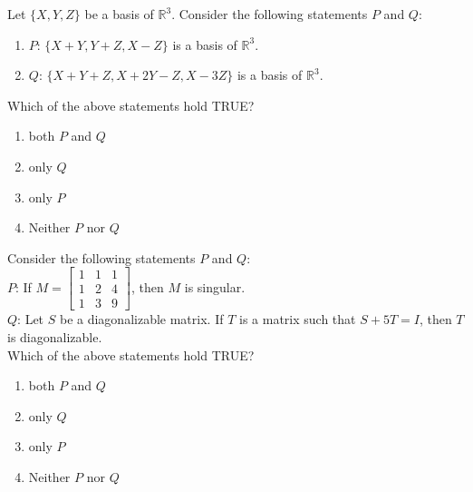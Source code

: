 \iffalse
                       
                        
                        
                        
                    
                        \author{AI24BTECH11006 - Bugada Roopansha}
                        \section{MA}
                        \chapter{2016}
                        \fi
 
    \item Let $\{X, Y, Z\}$ be a basis of $\mathbb{R}^3$. Consider the following statements $P$ and $Q$: 
    \begin{enumerate}
        \item $P$: $\{X+Y, Y+Z, X-Z\}$ is a basis of $\mathbb{R}^3$.
        \item $Q$: $\{X + Y + Z, X+2Y - Z, X-3Z\}$ is a basis of $\mathbb{R}^3$.
    \end{enumerate}
    Which of the above statements hold TRUE?
    \begin{enumerate}
        \item both $P$ and $Q$
        \item only $Q$
        \item only $P$
        \item Neither $P$ nor $Q$
    \end{enumerate}

    \item Consider the following statements $P$ and $Q$:\\
      $P$: If $M = \begin{bmatrix} 1 & 1 & 1 \\ 1 & 2 & 4 \\ 1 & 3 & 9 \end{bmatrix}$, then $M$ is singular.\\
 $Q$: Let $S$ be a diagonalizable matrix. If $T$ is a matrix such that $S + 5T = I$, then $T$ is diagonalizable.\\
    Which of the above statements hold TRUE?
    \begin{enumerate}
        \item both $P$ and $Q$
        \item only $Q$
        \item only $P$
        \item Neither $P$ nor $Q$
    \end{enumerate}

